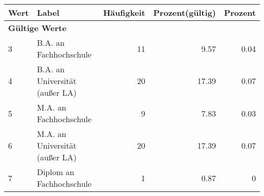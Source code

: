      \begin{longtable}{lXrrr}
     \toprule
     \textbf{Wert} & \textbf{Label} & \textbf{Häufigkeit} & \textbf{Prozent(gültig)} & \textbf{Prozent} \\
     \endhead
     \midrule
     \multicolumn{5}{l}{\textbf{Gültige Werte}}\\

     3 &
     \multicolumn{1}{X}{ B.A. an Fachhochschule   } &


       \num{11} &
       \num[round-mode=places,round-precision=2]{9.57} &
         \num[round-mode=places,round-precision=2]{0.04} \\

     4 &
     \multicolumn{1}{X}{ B.A. an Universität (außer LA)   } &


       \num{20} &
       \num[round-mode=places,round-precision=2]{17.39} &
         \num[round-mode=places,round-precision=2]{0.07} \\

     5 &
     \multicolumn{1}{X}{ M.A. an Fachhochschule   } &


       \num{9} &
       \num[round-mode=places,round-precision=2]{7.83} &
         \num[round-mode=places,round-precision=2]{0.03} \\

     6 &
     \multicolumn{1}{X}{ M.A. an Universität (außer LA)   } &


       \num{20} &
       \num[round-mode=places,round-precision=2]{17.39} &
         \num[round-mode=places,round-precision=2]{0.07} \\

     7 &
     \multicolumn{1}{X}{ Diplom an Fachhochschule   } &


       \num{1} &
       \num[round-mode=places,round-precision=2]{0.87} &
         \num[round-mode=places,round-precision=2]{0} \\


\end{longtable}
